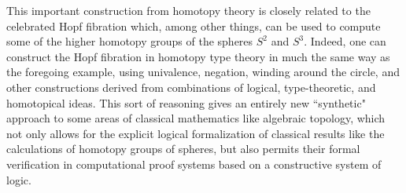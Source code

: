 \documentclass[11pt]{article}
\theoremstyle{remark}
\theoremstyle{definition}
\begin{document}
This important construction from homotopy theory is closely related to the celebrated Hopf fibration which, among other things, can be used to compute some of the higher homotopy groups of the spheres $S^2$ and $S^3$.  Indeed, one can construct the Hopf fibration in homotopy type theory in much the same way as the foregoing example, using univalence, negation, winding around the circle, and other constructions derived from combinations of logical, type-theoretic, and homotopical ideas.  This sort of reasoning gives an entirely new ``synthetic" approach to some areas of classical mathematics like algebraic topology, which not only allows for the explicit logical formalization of classical results like the calculations of homotopy groups of spheres, but also permits their formal verification in computational proof systems based on a constructive system of logic.
\end{document}
